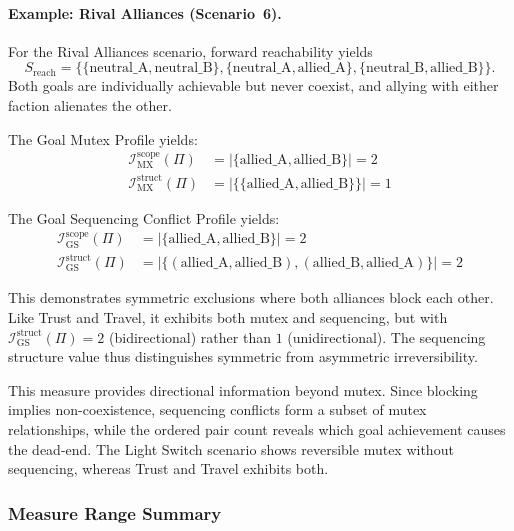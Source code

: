\paragraph{Example: Rival Alliances (Scenario~6).} For the Rival Alliances scenario, forward reachability yields
\begin{equation*}
    S_{\text{reach}} = \{\{\text{neutral\_A}, \text{neutral\_B}\}, \{\text{neutral\_A}, \text{allied\_A}\}, \{\text{neutral\_B}, \text{allied\_B}\}\}.
\end{equation*}
Both goals are individually achievable but never coexist, and allying with either faction alienates the other.

The Goal Mutex Profile yields:
\begin{align*}
    \mathcal{I}^{\text{scope}}_{\text{MX}}(\Pi)  & = |\{\text{allied\_A}, \text{allied\_B}\}| = 2     \\
    \mathcal{I}^{\text{struct}}_{\text{MX}}(\Pi) & = |\{\{\text{allied\_A}, \text{allied\_B}\}\}| = 1
\end{align*}

The Goal Sequencing Conflict Profile yields:
\begin{align*}
    \mathcal{I}^{\text{scope}}_{\text{GS}}(\Pi)  & = |\{\text{allied\_A}, \text{allied\_B}\}| = 2                                         \\
    \mathcal{I}^{\text{struct}}_{\text{GS}}(\Pi) & = |\{(\text{allied\_A}, \text{allied\_B}), (\text{allied\_B}, \text{allied\_A})\}| = 2
\end{align*}

This demonstrates symmetric exclusions where both alliances block each other. Like Trust and Travel, it exhibits both mutex and sequencing, but with $\mathcal{I}^{\text{struct}}_{\text{GS}}(\Pi) = 2$ (bidirectional) rather than $1$ (unidirectional). The sequencing structure value thus distinguishes symmetric from asymmetric irreversibility.

This measure provides directional information beyond mutex. Since blocking implies non-coexistence, sequencing conflicts form a subset of mutex relationships, while the ordered pair count reveals which goal achievement causes the dead-end. The Light Switch scenario shows reversible mutex without sequencing, whereas Trust and Travel exhibits both.

\subsubsection{Measure Range Summary}

